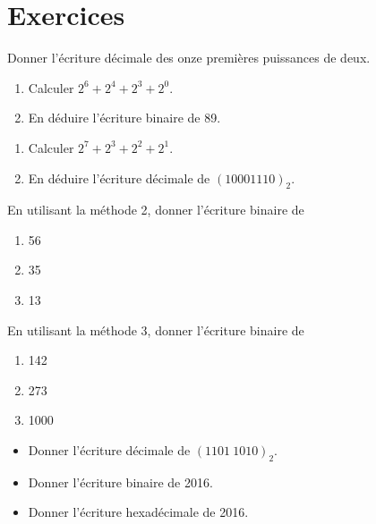 \section{Exercices}

\begin{exercice}
    Donner l'écriture décimale des onze premières puissances de deux.
\end{exercice}

\begin{exercice}
    \begin{enumerate}
        \item 	Calculer $2^6+2^4+2^3+2^0$.
        \item 	En déduire l'écriture binaire de 89.
    \end{enumerate}
\end{exercice}

\begin{exercice}
    \begin{enumerate}
        \item 	Calculer $2^7+2^3+2^2+2^1$.
        \item 	En déduire l'écriture décimale de  $(1000 1110)_2$.
    \end{enumerate}
\end{exercice}

\begin{exercice}[]
    En utilisant la méthode 2, donner l'écriture binaire de
    \begin{enumerate}
        \item 	56
        \item 	35
        \item 	13
    \end{enumerate}
\end{exercice}

\begin{exercice}[]
    En utilisant la méthode 3, donner l'écriture binaire de
    \begin{enumerate}
        \item 	142
        \item 	273
        \item 	1000
    \end{enumerate}
\end{exercice}

\begin{exercice}
    \begin{itemize}
        \item 	Donner l'écriture décimale de $(1101\ 1010)_2$.
        \item 	Donner l'écriture binaire de 2016.
        \item 	Donner l'écriture hexadécimale de 2016.
    \end{itemize}
\end{exercice}

